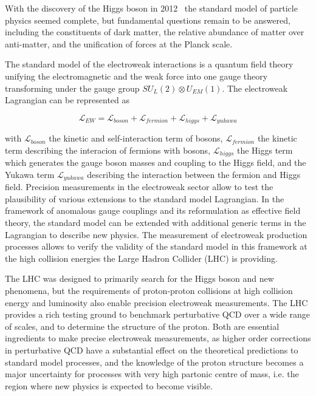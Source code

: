 \label{ss-intro-motivation}

With the discovery of the Higgs boson in 2012~\cite{Chatrchyan201230,
Aad20121} the standard model of particle physics seemed complete, but
fundamental questions remain to be answered, including the
constituents of dark matter, the relative abundance of matter over
anti-matter, and the unification of forces at the Planck scale.

The standard model of the electroweak interactions is a quantum field
theory unifying the electromagnetic and the weak force into one gauge
theory transforming under the gauge group $SU_L(2) \otimes U_{EM}(1)$.
The electroweak Lagrangian can be represented as

$$ \mathcal{L}_{EW} = \mathcal{L}_{boson} + \mathcal{L}_{fermion} + \mathcal{L}_{higgs} + \mathcal{L}_{yukawa} $$

with $\mathcal{L}_{boson}$ the kinetic and self-interaction term of
bosons, $\mathcal{L}_{fermion}$ the kinetic term describing the
interacion of fermions with bosons, $\mathcal{L}_{higgs}$ the Higgs
term which generates the gauge boson masses and coupling to the Higgs
field, and the Yukawa term $\mathcal{L}_{yukawa}$ describing the
interaction between the fermion and Higgs field.
Precision measurements in the electroweak sector allow to test the
plausibility of various extensions to the standard model
Lagrangian. In the framework of anomalous gauge couplings and its
reformulation as effective field theory, the standard model can be
extended with additional generic terms in the Lagrangian to describe
new physics. The measurement of electroweak production processes
allows to verify the validity of the standard model in this framework
at the high collision energies the Large Hadron Collider (LHC) is
providing.

The LHC was designed to primarily search for the Higgs boson and new
phenomena, but the requirements of proton-proton collisions at high
collision energy and luminosity also enable precision electroweak
measurements. The LHC
provides a rich testing ground to benchmark perturbative QCD over a
wide range of scales, and to determine the structure of the proton.
Both are essential ingredients to make precise electroweak
measurements, as higher order corrections in perturbative QCD have a
substantial effect on the theoretical predictions to standard model
processes, and the knowledge of the proton structure becomes a major
uncertainty for processes with very high partonic centre of mass,
i.e. the region where new physics is expected to become visible.

